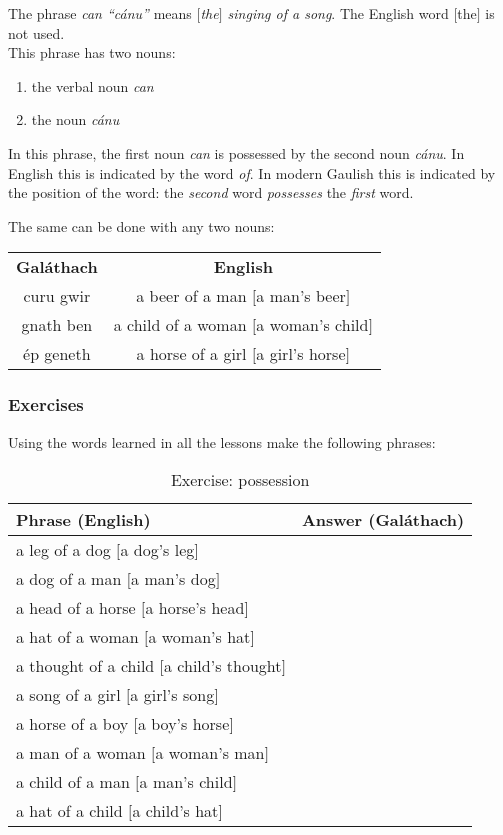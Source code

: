 The phrase \textit{can ``c\'{a}nu''} means \textit{$[$the$]$ singing of a song}. The English word $[$the$]$ is not used.\\

This phrase has two nouns:
\begin{enumerate}
 \item{the verbal noun \textit{can}}
 \item{the noun \textit{c\'{a}nu}}
\end{enumerate}
In this phrase, the first noun \textit{can} is possessed by the second noun \textit{c\'{a}nu}. In English this is indicated by the word \textit{of}. In modern Gaulish this is indicated by the position of the word: the \textit{second} word \textit{possesses} the \textit{first} word.

The same can be done with any two nouns:
\begin{table}[H]
\centering
\begin{tabular}{cc}
  \toprule
  \textbf{Gal\'{a}thach} & \textbf{English}\\
  \cmidrule(lr){1-1}\cmidrule(lr){2-2}
  curu gwir & a beer of a man $[$a man's beer$]$\\
  gnath ben & a child of a woman $[$a woman's child$]$\\
  \'{e}p geneth & a horse of a girl $[$a girl's horse$]$\\
  \bottomrule
\end{tabular}
\label{examples_possession_word_position}
\end{table}

\newpage
\subsubsection{Exercises}

Using the words learned in all the lessons make the following phrases:
\begin{table}[H]
\centering
\begin{tabular}{|l|M{10.0cm}|}
  \toprule
  \textbf{Phrase (English)} & \textbf{Answer (Gal\'{a}thach)}\\
  \toprule
  a leg of a dog $[$a dog's leg$]$ & \\
  \midrule
  a dog of a man $[$a man's dog$]$ & \\
  \midrule
  a head of a horse $[$a horse's head$]$ & \\
  \midrule
  a hat of a woman $[$a woman's hat$]$ & \\
  \midrule
  a thought of a child $[$a child's thought$]$ & \\
  \midrule
  a song of a girl $[$a girl's song$]$ & \\
  \midrule
  a horse of a boy $[$a boy's horse$]$ & \\
  \midrule
  a man of a woman $[$a woman's man$]$ & \\
  \midrule
  a child of a man $[$a man's child$]$ & \\
  \midrule
  a hat of a child $[$a child's hat$]$ & \\
  \bottomrule
\end{tabular}
\label{exercise_possession}
\caption{Exercise: possession}
\end{table}

